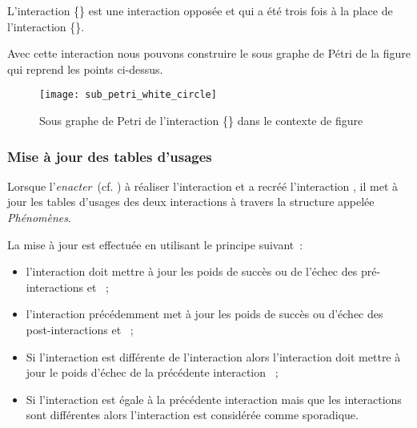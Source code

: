 \documentclass{llncs}
\begin{document}
L'interaction \{\rondBleu\} est une interaction opposée et qui a été \enacted trois fois à la place de l'interaction \{\rondBlanc\}.

Avec cette interaction nous pouvons construire le sous graphe de Pétri de la figure  qui reprend les points ci-dessus.
\begin{figure}
	\centering
	\texttt{[image: sub\_petri\_white\_circle]}
	\caption{Sous graphe de Petri de l'interaction \{\rondBlanc\} dans le contexte de figure~}
	\label{fig:sub_petri_white_circle}
\end{figure}


\subsubsection{Mise à jour des tables d'usages}
Lorsque l'\emph{enacter}~(cf. ) à réaliser l'interaction \intended et a recréé l'interaction \enacted, il met à jour les tables d'usages des deux interactions à travers la structure appelée \emph{Phénomènes}. 

La mise à jour est effectuée en utilisant le principe suivant~:
\begin{itemize}
	\item l'interaction \enacted doit mettre à jour les poids de succès ou de l'échec des pré-interactions \intended et \enacted~;
	\item l'interaction précédemment \enacted met à jour les poids de succès ou d'échec des post-interactions \intended et \enacted~;
	\item Si l'interaction \intended est différente de l'interaction \enacted alors l'interaction \intended doit mettre à jour le poids d'échec de la précédente interaction \enacted~;
	\item Si l'interaction \intended est égale à la précédente interaction \intended mais que les interactions \enacted sont différentes alors l'interaction \intended est considérée comme sporadique.
\end{itemize}
\end{document}
